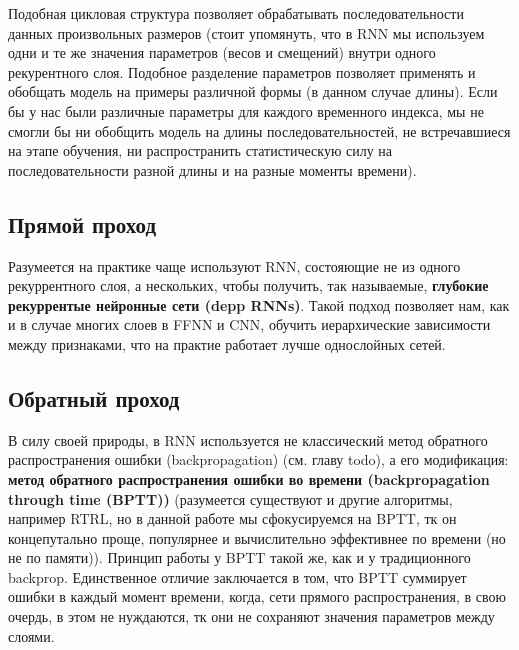 Подобная цикловая структура позволяет обрабатывать последовательности 
данных произвольных размеров (стоит упомянуть, что в RNN мы используем 
одни и те же значения параметров (весов и смещений) 
внутри одного рекурентного слоя. Подобное разделение параметров позволяет 
применять и обобщать модель на примеры различной формы 
(в данном случае длины). Если бы у нас были различные параметры для 
каждого временного индекса, мы не смогли бы ни обобщить
модель на длины последовательностей, не встречавшиеся на этапе обучения, ни 
распространить статистическую силу на последовательности разной длины и 
на разные моменты времени).

\subsection{Прямой проход}



Разумеется на практике чаще используют RNN, состояющие не из одного 
рекуррентного слоя, а нескольких, чтобы получить, так называемые, 
\textbf{глубокие рекуррентые нейронные сети (depp RNNs)}. Такой подход 
позволяет нам, как и в случае многих слоев в FFNN и CNN, 
обучить иерархические зависимости между признаками, что на практие 
работает лучше однослойных сетей. 

\subsection{Обратный проход}

В силу своей природы, в RNN используется не классический метод обратного 
распространения ошибки (backpropagation) 
(см. главу {\color{red} todo}), а его модификация: 
\textbf{метод обратного распространения ошибки во времени 
(backpropagation through time (BPTT))} (разумеется существуют 
и другие алгоритмы, например RTRL, но в данной работе мы сфокусируемся на 
BPTT, тк он концепутально проще, популярнее и вычислительно эффективнее по времени 
(но не по памяти)). Принцип работы у BPTT такой же, как и у 
традиционного backprop. Единственное отличие заключается в том, что BPTT 
суммирует ошибки в каждый момент времени, когда, сети прямого распространения, 
в свою очердь, в этом не нуждаются, тк они не сохраняют значения параметров между 
слоями.


